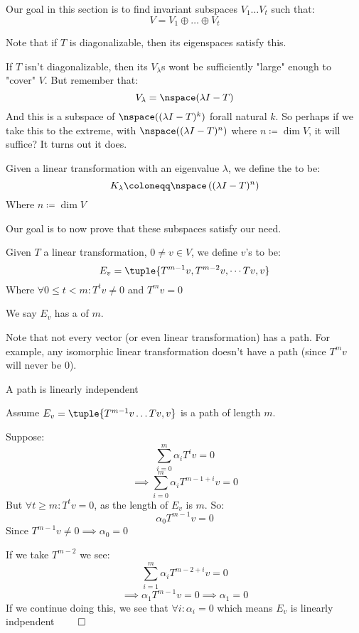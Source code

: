 \documentclass[10pt]{article}
\begin{document}
\noindent Our goal in this section is to find invariant subspaces $V_1\dots V_t$ such that:
\[ V = V_1\oplus\dots\oplus V_t \]

Note that if $T$ is diagonalizable, then its eigenspaces satisfy this.

If $T$ isn't diagonalizable, then its $V_\lambda$s wont be sufficiently "large" enough to "cover" $V$. But remember that:
\[ V_\lambda = \nspace(\lambda I - T) \]
And this is a subspace of $\nspace((\lambda I - T)^k)$ forall natural $k$. So perhaps if we take this to the extreme, with $\nspace((\lambda I - T)^n)$ where $n\coloneqq\dim V$, it will suffice? It turns out it does.

\newpage
\begin{definition}

Given a linear transformation with an eigenvalue $\lambda$, we define the  to be:
\[ K_\lambda\coloneqq \nspace\left((\lambda I - T)^n\right) \]
Where $n\coloneqq\dim V$

\end{definition}

\noindent Our goal is to now prove that these subspaces satisfy our need.

\begin{definition}

Given $T$ a linear transformation, $0\neq v\in V$, we define $v$'s  to be:
\[ E_v = \tuple{T^{m-1}v, T^{m-2}v,\cdots Tv, v} \]
Where $\forall 0\leq t<m: T^tv \neq 0$ and $T^mv=0$

We say $E_v$ has a  of $m$.

\end{definition}

\noindent Note that not every vector (or even linear transformation) has a path. For example, any isomorphic linear transformation doesn't have a path (since $T^mv$ will never be $0$).

\begin{lemma}{A path is linearly independent}

Assume $E_v=\tuple{T^{m-1}v\dots Tv, v}$ is a path of length $m$.

Suppose:
\[ \sum_{i=0}^m \alpha_iT^iv = 0 \]
\[ \implies \sum_{i=0}^m \alpha_i T^{m-1+i}v = 0 \]
But $\forall t\geq m: T^tv = 0$, as the length of $E_v$ is $m$. So:
\[ \alpha_0T^{m-1}v = 0 \]
Since $T^{m-1}v\neq0\implies\alpha_0=0$

If we take $T^{m-2}$ we see:
\[ \sum_{i=1}^m \alpha_i T^{m-2+i}v = 0 \]
\[ \implies \alpha_1 T^{m-1}v = 0 \implies \alpha_1 = 0 \]
If we continue doing this, we see that $\forall i:\alpha_i=0$ which means $E_v$ is linearly indpendent $\qed$

\end{lemma}
\end{document}
